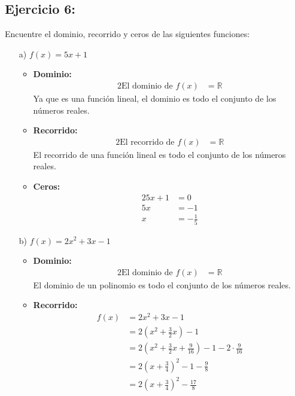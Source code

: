 \documentclass{templateNote}
\begin{document}
\subsection*{\textbf{Ejercicio 6:}}
Encuentre el dominio, recorrido y ceros de las siguientes funciones:
\begin{itemize}
    \item[a)] $f(x) = 5x + 1$
    \begin{itemize}
        \item \textbf{Dominio:}
        \begin{alignat*}{2}
            \text{El dominio de } f(x) &= \mathbb{R}
        \end{alignat*}
        Ya que es una función lineal, el dominio es todo el conjunto de los números reales.
        \item \textbf{Recorrido:}
        \begin{alignat*}{2}
            \text{El recorrido de } f(x) &= \mathbb{R}
        \end{alignat*}
        El recorrido de una función lineal es todo el conjunto de los números reales.
        \item \textbf{Ceros:}
        \begin{alignat*}{2}
            5x + 1 &= 0 \\
            5x &= -1 \\
            x &= -\frac{1}{5}
        \end{alignat*}
    \end{itemize}
    \item[b)] $f(x) = 2x^2 + 3x - 1$
    \begin{itemize}
        \item \textbf{Dominio:}
        \begin{alignat*}{2}
            \text{El dominio de } f(x) &= \mathbb{R}
        \end{alignat*}
        El dominio de un polinomio es todo el conjunto de los números reales.
        \item \textbf{Recorrido:}
        \begin{align*}
            f(x) &= 2x^2 + 3x - 1 \\
            &= 2(x^2 + \frac{3}{2}x) - 1 \\
            &= 2(x^2 + \frac{3}{2}x + \frac{9}{16}) - 1 - 2 \cdot \frac{9}{16} \\
            &= 2(x + \frac{3}{4})^2 - 1 - \frac{9}{8} \\
            &= 2(x + \frac{3}{4})^2 - \frac{17}{8}

\end{align*}
\end{itemize}
\end{itemize}
\end{document}
